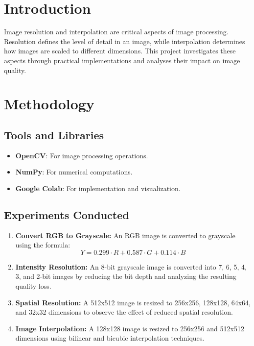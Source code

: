 \documentclass{report}
\begin{document}
\section{Introduction}
Image resolution and interpolation are critical aspects of image processing. Resolution defines the level of detail in an image, while interpolation determines how images are scaled to different dimensions. This project investigates these aspects through practical implementations and analyses their impact on image quality.

\section{Methodology}
\subsection{Tools and Libraries}
\begin{itemize}
    \item \textbf{OpenCV}: For image processing operations.
    \item \textbf{NumPy}: For numerical computations.
    \item \textbf{Google Colab}: For implementation and visualization.
\end{itemize}

\subsection{Experiments Conducted}
\begin{enumerate}
    \item \textbf{Convert RGB to Grayscale:} An RGB image is converted to grayscale using the formula:
    \[ Y = 0.299 \cdot R + 0.587 \cdot G + 0.114 \cdot B \]

    \item \textbf{Intensity Resolution:} An 8-bit grayscale image is converted into 7, 6, 5, 4, 3, and 2-bit images by reducing the bit depth and analyzing the resulting quality loss.

    \item \textbf{Spatial Resolution:} A 512x512 image is resized to 256x256, 128x128, 64x64, and 32x32 dimensions to observe the effect of reduced spatial resolution.

    \item \textbf{Image Interpolation:} A 128x128 image is resized to 256x256 and 512x512 dimensions using bilinear and bicubic interpolation techniques.
\end{enumerate}
\end{document}
